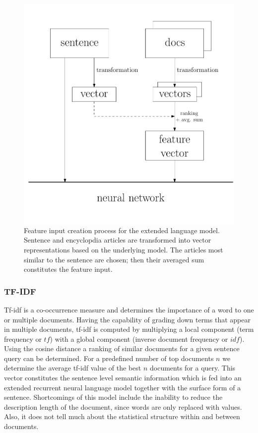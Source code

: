 \documentclass[a4paper]{article}
\begin{document}
\begin{figure} 
\centering 
\includegraphics[width=\columnwidth]{flow.pdf}
\caption{Feature input creation process for the extended language model. Sentence and encyclopdia articles are transformed into vector representations based on the underlying model. The articles most similar to the sentence are chosen; then their averaged sum constitutes the feature input.}
\label{fig:flow}
\end{figure}

\subsubsection{TF-IDF}
Tf-idf \cite{salton1986introduction} is a co-occurrence measure and determines the importance of a word to one or multiple documents. Having the capability of grading down terms that appear in multiple documents, tf-idf is computed by multiplying a local component (term frequency or $tf$) with a global component (inverse document frequency or $idf$).
Using the cosine distance a ranking of similar documents for a given sentence query can be determined.
For a predefined number of top documents $n$ we determine the average tf-idf value of the best $n$ documents for a query.
This vector constitutes the sentence level semantic information which is fed into an extended recurrent neural language model together with the surface form of a sentence.
Shortcomings of this model include the inability to reduce the description length of the document, since words are only replaced with values. Also, it does not tell much about the statistical structure within and between documents.
\end{document}
